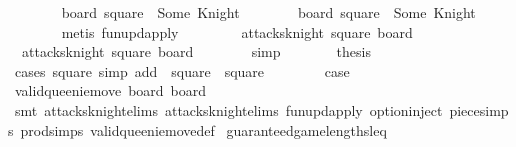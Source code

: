 \begin{isabellebody}
\ \ \ \ \ \ \isamarkupfalse%
\ {\isacharbackquoteopen}board\ square\ {\isasymnoteq}\ Some\ Knight{\isacharbackquoteclose}\isanewline
\ \ \ \ \ \ \isamarkupfalse%
\ {\isacharbackquoteopen}board{\isacharprime}\ square\ {\isacharequal}\ Some\ Knight{\isacharbackquoteclose}\isanewline
\ \ \ \ \ \ \isamarkupfalse%
\ {\isacharparenleft}metis\ fun{\isacharunderscore}upd{\isacharunderscore}apply{\isacharparenright}\isanewline
\ \ \ \ \isamarkupfalse%
\ \isamarkupfalse%
\ {\isachardoublequoteopen}{\isasymnot}\ attacks{\isacharunderscore}knight\ square\ board{\isachardoublequoteclose}\isanewline
\ \ \ \ \ \ \isamarkupfalse%
\ {\isacharbackquoteopen}{\isasymnot}\ attacks{\isacharunderscore}knight\ square{\isacharprime}\ board{\isacharbackquoteclose}\isanewline
\ \ \ \ \ \ \isamarkupfalse%
\ simp\isanewline
\ \ \ \ \isamarkupfalse%
\ \isamarkupfalse%
\ {\isacharquery}thesis\isanewline
\ \ \ \ \ \ \isamarkupfalse%
\ {\isacharparenleft}cases\ square{\isacharparenright}\ {\isacharparenleft}simp\ add{\isacharcolon}\ {\isachardoublequoteopen}{\isacharasterisk}{\isachardoublequoteclose}{\isacharparenleft}{}{\isacharparenright}\ {\isacartoucheopen}square\ {\isacharequal}\ square{\isacharprime}{\isacartoucheclose}{\isacharparenright}\isanewline
\ \ \isamarkupfalse%
\isanewline
\ \ \isamarkupfalse%
\ \isamarkupfalse%
\ {\isacharquery}case\isanewline
\ \ \ \ \isamarkupfalse%
\ {\isacharbackquoteopen}valid{\isacharunderscore}queenie{\isacharunderscore}move\ board{\isacharprime}\ board{\isacharprime}{\isacharprime}{\isacharbackquoteclose}\isanewline
\ \ \ \ \isamarkupfalse%
\ {\isacharparenleft}smt\ attacks{\isacharunderscore}knight{\isachardot}elims{\isacharparenleft}{}{\isacharparenright}\ attacks{\isacharunderscore}knight{\isachardot}elims{\isacharparenleft}{}{\isacharparenright}\ fun{\isacharunderscore}upd{\isacharunderscore}apply\ option{\isachardot}inject\ piece{\isachardot}simps{\isacharparenleft}{}{\isacharparenright}\ prod{\isachardot}simps{\isacharparenleft}{}{\isacharparenright}\ valid{\isacharunderscore}queenie{\isacharunderscore}move{\isacharunderscore}def{\isacharparenright}\isanewline
{}\isamarkupfalse%
%
\endisatagproof
{\isafoldproof}%
%
\isadelimproof
\isanewline
%
\endisadelimproof
\isanewline
{}\isamarkupfalse%
\ guaranteed{\isacharunderscore}game{\isacharunderscore}lengths{\isacharunderscore}leq{\isacharcolon}\isanewline

\end{isabellebody}
